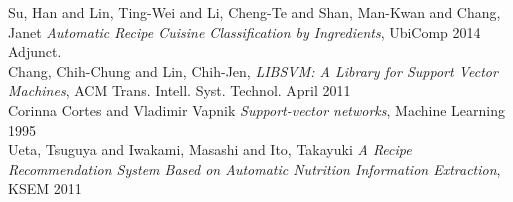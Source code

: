 \documentclass[prodmode,acmtap]{acmlarge}
\begin{document}
\begin{thebibliography}{1}

   Su, Han and Lin, Ting-Wei and Li, Cheng-Te and Shan, Man-Kwan and Chang, Janet {\em Automatic Recipe Cuisine Classification by Ingredients},  UbiComp 2014 Adjunct.
\\
   Chang, Chih-Chung and Lin, Chih-Jen, {\em LIBSVM: A Library for Support Vector Machines}, ACM Trans. Intell. Syst. Technol. April 2011
\\

   Corinna Cortes and Vladimir Vapnik {\em Support-vector networks}, Machine Learning 1995
 \\

   Ueta, Tsuguya and Iwakami, Masashi and Ito, Takayuki {\em A Recipe Recommendation System Based on Automatic Nutrition Information Extraction}, KSEM 2011 


\end{thebibliography}
\end{document}
